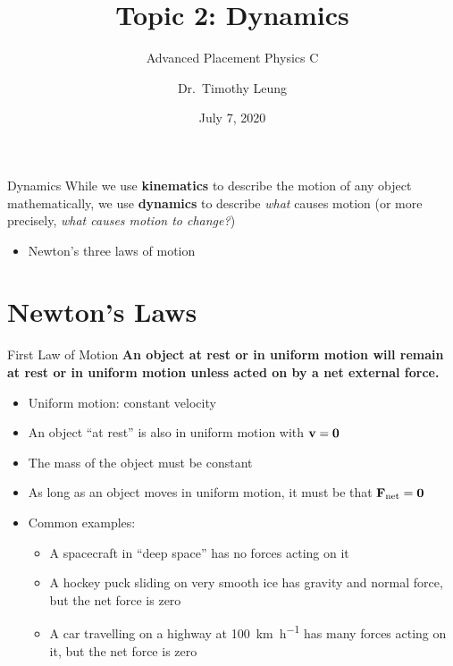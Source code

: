 \documentclass[12pt,compress,aspectratio=169]{beamer}
\title{Topic 2: Dynamics}
\subtitle{Advanced Placement Physics C}
\author[TML]{Dr.\ Timothy Leung}
\institute{Olympiads School}
\date{July 7, 2020}
\newcommand{\mb}[1]{\ensuremath\mathbf{#1}}
\begin{document}
\begin{frame}
  \maketitle
\end{frame}

\begin{frame}{Dynamics}
  While we use \textbf{kinematics} to describe the motion of any object
  mathematically, we use \textbf{dynamics} to describe \emph{what} causes
  motion (or more precisely, \emph{what causes motion to change?})
  \begin{itemize}
  \item Newton's three laws of motion
  \end{itemize}
\end{frame}



\section{Newton's Laws}

\begin{frame}{First Law of Motion}
  \textbf{An object at rest or in uniform motion will remain at rest or
    in uniform motion unless acted on by a net external force.}
  \begin{itemize}
  \item Uniform motion: constant velocity
  \item An object ``at rest'' is also in uniform motion with $\mb{v}=\mb{0}$
  \item \textcolor{red!80!black}{The mass of the object must be constant}
  \item As long as an object moves in uniform motion, it must be that
    $\mb{F}_\mathrm{net}=\mb{0}$
  \item Common examples:
    \begin{itemize}
    \item A spacecraft in ``deep space'' has no forces acting on it
    \item A hockey puck sliding on very smooth ice has gravity and normal
      force, but the net force is zero
    \item A car travelling on a highway at \SI{100}{\kilo\metre\per\hour}
      has many forces acting on it, but the net force is zero 
    \end{itemize}
  \end{itemize}
\end{frame}
\end{document}
